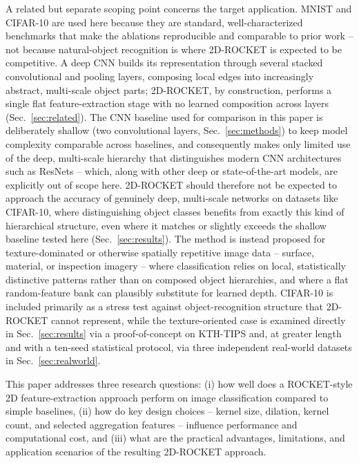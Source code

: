 \documentclass[a4paper,fleqn]{cas-sc}
\begin{document}
A related but separate scoping point concerns the target application. MNIST and CIFAR-10 are used here because they are standard, well-characterized benchmarks that make the ablations reproducible and comparable to prior work -- not because natural-object recognition is where 2D-ROCKET is expected to be competitive. A deep CNN builds its representation through several stacked convolutional and pooling layers, composing local edges into increasingly abstract, multi-scale object parts; 2D-ROCKET, by construction, performs a single flat feature-extraction stage with no learned composition across layers (Sec.~\ref{sec:related}). The CNN baseline used for comparison in this paper is deliberately shallow (two convolutional layers, Sec.~\ref{sec:methods}) to keep model complexity comparable across baselines, and consequently makes only limited use of the deep, multi-scale hierarchy that distinguishes modern CNN architectures such as ResNets -- which, along with other deep or state-of-the-art models, are explicitly out of scope here. 2D-ROCKET should therefore not be expected to approach the accuracy of genuinely deep, multi-scale networks on datasets like CIFAR-10, where distinguishing object classes benefits from exactly this kind of hierarchical structure, even where it matches or slightly exceeds the shallow baseline tested here (Sec.~\ref{sec:results}). The method is instead proposed for texture-dominated or otherwise spatially repetitive image data -- surface, material, or inspection imagery -- where classification relies on local, statistically distinctive patterns rather than on composed object hierarchies, and where a flat random-feature bank can plausibly substitute for learned depth. CIFAR-10 is included primarily as a stress test against object-recognition structure that 2D-ROCKET cannot represent, while the texture-oriented case is examined directly in Sec.~\ref{sec:results} via a proof-of-concept on KTH-TIPS and, at greater length and with a ten-seed statistical protocol, via three independent real-world datasets in Sec.~\ref{sec:realworld}.

This paper addresses three research questions: (i) how well does a ROCKET-style 2D feature-extraction approach perform on image classification compared to simple baselines, (ii) how do key design choices -- kernel size, dilation, kernel count, and selected aggregation features -- influence performance and computational cost, and (iii) what are the practical advantages, limitations, and application scenarios of the resulting 2D-ROCKET approach.
\end{document}
